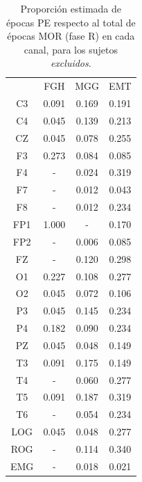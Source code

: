 \begin{table}
\centering
\begin{tabular}{c|ccc}
& FGH & MGG & EMT \\
 C3 & 0.091    & 0.169    & 0.191     \\
 C4 & 0.045    & 0.139    & 0.213     \\
 CZ & 0.045    & 0.078    & 0.255     \\
 F3 & 0.273    & 0.084    & 0.085     \\
 F4 & -      & 0.024    & 0.319     \\
 F7 & -      & 0.012    & 0.043     \\
 F8 & -      & 0.012    & 0.234     \\
 FP1 & 1.000    & -      & 0.170     \\
 FP2 & -      & 0.006    & 0.085     \\
 FZ & -      & 0.120    & 0.298     \\
 O1 & 0.227    & 0.108    & 0.277     \\
 O2 & 0.045    & 0.072    & 0.106     \\
 P3 & 0.045    & 0.145    & 0.234     \\
 P4 & 0.182    & 0.090    & 0.234     \\
 PZ & 0.045    & 0.048    & 0.149     \\
 T3 & 0.091    & 0.175    & 0.149     \\
 T4 & -      & 0.060    & 0.277     \\
 T5 & 0.091    & 0.187    & 0.319     \\
 T6 & -      & 0.054    & 0.234     \\
 LOG & 0.045    & 0.048    & 0.277     \\
 ROG & -      & 0.114    & 0.340     \\
 EMG & -      & 0.018    & 0.021    
\end{tabular}
\caption{Proporci\'on estimada de \'epocas PE respecto al total de \'epocas
MOR (fase R) en cada
canal, para los sujetos \textit{excluidos}.}
\label{gpo_zz_mor}
\end{table}

